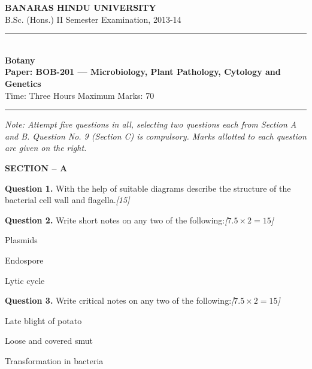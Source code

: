 \documentclass[11pt,a4paper]{article}
\newcommand{\pts}[1]{\hfill   \textit{[#1]}}
\begin{document}
\begin{center}
  {\large\bfseries BANARAS HINDU UNIVERSITY}\\[2pt]
  {\normalsize B.Sc. (Hons.) II Semester Examination, 2013-14}\\[6pt]
  \rule{0.8\linewidth}{0.5pt}\\[6pt]
  {\large\bfseries Botany}\\[4pt]
  {\large\bfseries Paper: BOB-201 --- Microbiology, Plant Pathology, Cytology and Genetics}\\[4pt]
  {\normalsize Time: Three Hours \hfill Maximum Marks: 70}
\end{center}

\rule{\linewidth}{0.4pt}

\smallskip



\noindent   \textit{Note: Attempt five questions in all, selecting two questions each from Section A and B. Question No. 9 (Section C) is compulsory. Marks allotted to each question are given on the right.}

\bigskip


\begin{center}
   \textbf{SECTION -- A}
\end{center}
\medskip

\medskip


\noindent   \textbf{Question 1.} With the help of suitable diagrams describe the structure of the bacterial cell wall and flagella.\pts{15}

\medskip


\noindent   \textbf{Question 2.} Write short notes on any two of the following:\pts{$7.5  \times 2 = 15$}

\begin{parts}
  \item Plasmids
  \item Endospore
  \item Lytic cycle
\end{parts}

\medskip


\noindent   \textbf{Question 3.} Write critical notes on any two of the following:\pts{$7.5  \times 2 = 15$}

\begin{parts}
  \item Late blight of potato
  \item Loose and covered smut
  \item Transformation in bacteria
\end{parts}
\end{document}
